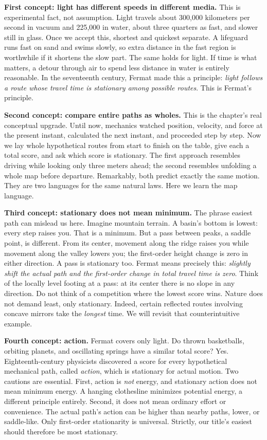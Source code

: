\begin{mainline}
\textbf{First concept: light has different speeds in different media.} This is experimental fact, not assumption. Light travels about 300,000 kilometers per second in vacuum and 225,000 in water, about three quarters as fast, and slower still in glass. Once we accept this, shortest and quickest separate. A lifeguard runs fast on sand and swims slowly, so extra distance in the fast region is worthwhile if it shortens the slow part. The same holds for light. If time is what matters, a detour through air to spend less distance in water is entirely reasonable. In the seventeenth century, Fermat made this a principle: \emph{light follows a route whose travel time is stationary among possible routes}. This is Fermat's principle.

\textbf{Second concept: compare entire paths as wholes.} This is the chapter's real conceptual upgrade. Until now, mechanics watched position, velocity, and force at the present instant, calculated the next instant, and proceeded step by step. Now we lay whole hypothetical routes from start to finish on the table, give each a total score, and ask which score is stationary. The first approach resembles driving while looking only three meters ahead; the second resembles unfolding a whole map before departure. Remarkably, both predict exactly the same motion. They are two languages for the same natural laws. Here we learn the map language.

\textbf{Third concept: stationary does not mean minimum.} The phrase easiest path can mislead us here. Imagine mountain terrain. A basin's bottom is lowest: every step raises you. That is a minimum. But a pass between peaks, a saddle point, is different. From its center, movement along the ridge raises you while movement along the valley lowers you; the first-order height change is zero in either direction. A pass is stationary too. Fermat means precisely this: \emph{slightly shift the actual path and the first-order change in total travel time is zero}. Think of the locally level footing at a pass: at its center there is no slope in any direction. Do not think of a competition where the lowest score wins. Nature does not demand least, only stationary. Indeed, certain reflected routes involving concave mirrors take the \emph{longest} time. We will revisit that counterintuitive example.

\textbf{Fourth concept: action.} Fermat covers only light. Do thrown basketballs, orbiting planets, and oscillating springs have a similar total score? Yes. Eighteenth-century physicists discovered a score for every hypothetical mechanical path, called \emph{action}, which is stationary for actual motion. Two cautions are essential. First, action is \emph{not} energy, and stationary action does not mean minimum energy. A hanging clothesline minimizes potential energy, a different principle entirely. Second, it does not mean ordinary effort or convenience. The actual path's action can be higher than nearby paths, lower, or saddle-like. Only first-order stationarity is universal. Strictly, our title's easiest should therefore be most stationary.


\end{mainline}
